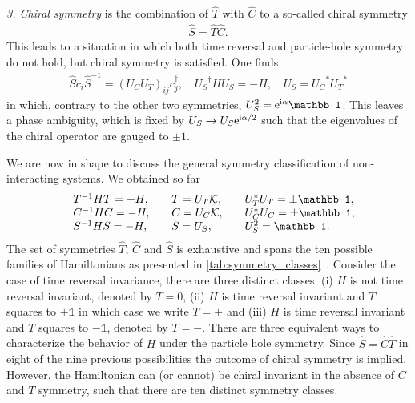 {\it 3. Chiral symmetry} is the combination of $\hat T$ with $\hat C$ to a so-called chiral symmetry
\begin{align}
    \hat S = \hat T \hat C.
\end{align}
This leads to a situation in which both time reversal and particle-hole symmetry do not hold, but chiral symmetry is satisfied.
One finds
\begin{align}
    \hat S c_i \hat S^{-1} = (U_CU_T)_{ij}c^\dag_j
    ,\quad
    {U_S}^\dag H {U_S} = -H
    ,\quad
    {U_S} = {U_C}^* {U_T}^*
\end{align}
in which, contrary to the other two symmetries, $U_S^2=\re^{\ri\alpha}\mathbb1$.
This leaves a phase ambiguity, which is fixed by $U_S\rightarrow U_S\mathrm e^{\mathrm i\alpha/2}$ such that the eigenvalues of the chiral operator are gauged to $\pm1$.

We are now in shape to discuss the general symmetry classification of non-interacting systems.
We obtained so far
\begin{align}
    \begin{array}{l l l l }
        & T^{-1}HT = +H
        ,\quad
        & T = U_T\mathcal K
        ,\quad
        & U_T^*U_T = \pm\mathbb1,\\
        & C^{-1}HC = -H
        ,\quad
        & C = U_C\mathcal K
        ,\quad
        & U_C^*U_C = \pm\mathbb1,\\
        & S^{-1}HS = -H
        ,\quad
        & S = U_S
        ,\qquad
        & U_S^2 = \mathbb1.
    \end{array}
    \label{eq:symmetry_real_space}
\end{align}
The set of symmetries $\hat T$, $\hat C$ and $\hat S$ is exhaustive and spans the ten possible families of Hamiltonians as presented in \cref{tab:symmetry_classes}~\cite{Chiu2016}.
Consider the case of time reversal invariance, there are three distinct classes:
(i) $H$ is not time reversal invariant, denoted by $T=0$, (ii) $H$ is time reversal invariant and $T$ squares to $+\mathbb1$ in which case we write $T=+$ and (iii) $H$ is time reversal invariant and $T$ squares to $-\mathbb1$, denoted by $T=-$.
There are three equivalent ways to characterize the behavior of $H$ under the particle hole symmetry.
Since $\hat S = \hat C\hat T$ in eight of the nine previous possibilities the outcome of chiral symmetry is implied.
However, the Hamiltonian can (or cannot) be chiral invariant in the absence of $C$ and $T$ symmetry, such that there are ten distinct symmetry classes.

